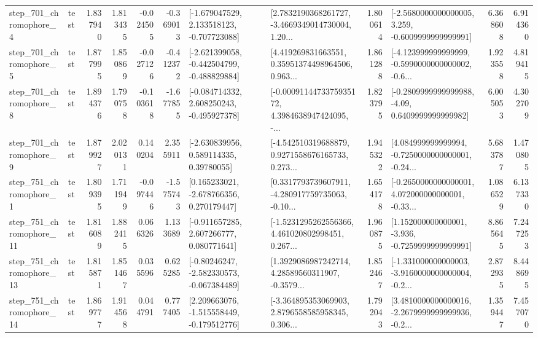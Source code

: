 \begin{tabular}{llrrrrllrlrr}
   step\_701\_chromophore\_4 &      test &      1.837940 &    1.813435 &     -0.024505 & -0.369013 &   [-1.679047529, 2.133518123, -0.707723088] &  [2.7832190368261727, -3.4669349014730004, 1.20... &       1.800614 &  [-2.5680000000000005, 3.259, -0.6009999999999991] &            6.368608 &          6.914360 \\
   step\_701\_chromophore\_5 &      test &      1.877995 &    1.850869 &     -0.027126 & -0.412372 &  [-2.621399058, -0.442504799, -0.488829884] &  [4.419269831663551, 0.35951374498964506, 0.963... &       1.861288 &  [-4.123999999999999, -0.5990000000000002, -0.6... &            1.923558 &          4.819415 \\
   step\_701\_chromophore\_8 &      test &      1.894376 &    1.790758 &     -0.103618 & -1.677855 &   [-0.084714332, 2.608250243, -0.495927378] &  [-0.0009114473375935172, 4.3984638947424095, -... &       1.823795 &   [-0.2809999999999988, -4.09, 0.6409999999999982] &            6.005053 &          4.302709 \\
   step\_701\_chromophore\_9 &      test &      1.879927 &    2.020131 &      0.140204 &  2.355911 &     [-2.630839956, 0.589114335, 0.39780055] &  [-4.542510319688879, 0.9271558676165733, 0.273... &       1.945322 &  [4.084999999999994, -0.7250000000000001, -0.24... &            5.683787 &          1.470805 \\
   step\_751\_chromophore\_1 &      test &      1.809395 &    1.711949 &     -0.097446 & -1.575743 &    [0.165233021, -2.678766356, 0.270179447] &  [0.3317793739607911, -4.280917759735063, -0.10... &       1.654178 &  [-0.2650000000000001, 4.072000000000001, -0.33... &            1.086529 &          6.137330 \\
  step\_751\_chromophore\_11 &      test &      1.816089 &    1.882415 &      0.066326 &  1.133689 &    [-0.911657285, 2.607266777, 0.080771641] &  [-1.5231295262556366, 4.461020802998451, 0.267... &       1.960875 &   [1.152000000000001, -3.936, -0.7259999999999991] &            8.865645 &          7.247253 \\
  step\_751\_chromophore\_13 &      test &      1.815871 &    1.851467 &      0.035596 &  0.625285 &   [-0.80246247, -2.582330573, -0.067384489] &  [1.3929086987242714, 4.28589560311907, -0.3579... &       1.852467 &  [-1.331000000000003, -3.9160000000000004, -0.2... &            2.872935 &          8.448695 \\
  step\_751\_chromophore\_14 &      test &      1.869777 &    1.914568 &      0.044791 &  0.777405 &   [2.209663076, -1.515558449, -0.179512776] &  [-3.364895353069903, 2.8796558585958345, 0.306... &       1.792043 &  [3.4810000000000016, -2.2679999999999936, -0.2... &            1.359447 &          7.457070 \\

\end{tabular}
